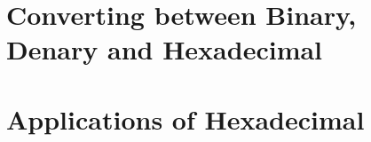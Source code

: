 \documentclass[../main.tex]{subfiles}
\begin{document}
\section{Converting between Binary, Denary and Hexadecimal}
\label{sec:1-converting-between-bin-den-and-hexadecimal}


\section{Applications of Hexadecimal}
\label{sec:1-applications-of-hexadecimal}

\end{document}
